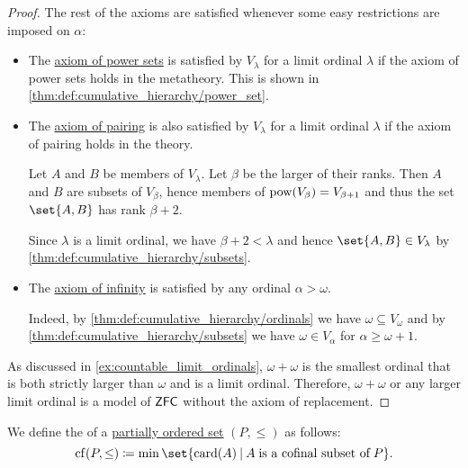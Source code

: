 \begin{proof}
  The rest of the axioms are satisfied whenever some easy restrictions are imposed on \( \alpha \):
  \begin{itemize}
    \item The \hyperref[def:zfc/power_set]{axiom of power sets} is satisfied by \( V_\lambda \) for a limit ordinal \( \lambda \) if the axiom of power sets holds in the metatheory. This is shown in \cref{thm:def:cumulative_hierarchy/power_set}.

    \item The \hyperref[def:zfc/pairing]{axiom of pairing} is also satisfied by \( V_\lambda \) for a limit ordinal \( \lambda \) if the axiom of pairing holds in the theory.

    Let \( A \) and \( B \) be members of \( V_\lambda \). Let \( \beta \) be the larger of their ranks. Then \( A \) and \( B \) are subsets of \( V_\beta \), hence members of \( \operatorname{pow}(V_\beta) = V_{\beta + 1} \) and thus the set \( \set{ A, B } \) has rank \( \beta + 2 \).

    Since \( \lambda \) is a limit ordinal, we have \( \beta + 2 < \lambda \) and hence \( \set{ A, B } \in V_\lambda \) by \cref{thm:def:cumulative_hierarchy/subsets}.

    \item The \hyperref[def:zfc/infinity]{axiom of infinity} is satisfied by any ordinal \( \alpha > \omega \).

    Indeed, by \cref{thm:def:cumulative_hierarchy/ordinals} we have \( \omega \subseteq V_\omega \) and by \cref{thm:def:cumulative_hierarchy/subsets} we have \( \omega \in V_\alpha \) for \( \alpha \geq \omega + 1 \).
  \end{itemize}

  As discussed in \cref{ex:countable_limit_ordinals}, \( \omega + \omega \) is the smallest ordinal that is both strictly larger than \( \omega \) and is a limit ordinal. Therefore, \( \omega + \omega \) or any larger limit ordinal is a model of \( \textsf{ZFC} \) without the axiom of replacement.
\end{proof}

\begin{definition}\label{def:cofinality}
  We define the  of a \hyperref[def:partially_ordered_set]{partially ordered set} \( (P, \leq) \) as follows:
  \begin{equation*}
     \op{cf}(P, \leq) \coloneqq \min\set{ \card(A) \given A \T{is a cofinal subset of} P }.
  \end{equation*}
\end{definition}

